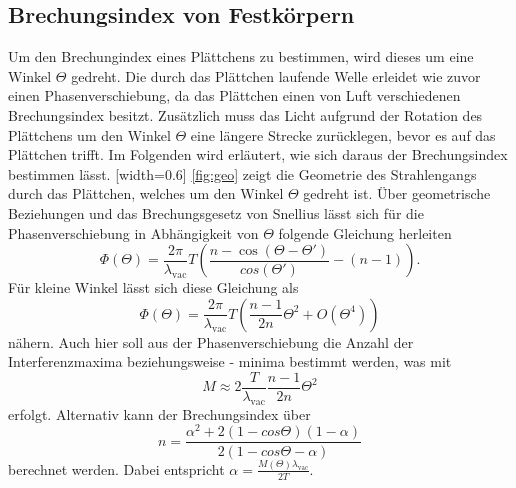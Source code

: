 \subsection{Brechungsindex von Festkörpern}
Um den Brechungindex eines Plättchens zu bestimmen, wird dieses um eine Winkel $\Theta$ gedreht. Die durch das Plättchen laufende Welle erleidet wie zuvor einen Phasenverschiebung, da das Plättchen einen von Luft verschiedenen Brechungsindex besitzt. Zusätzlich muss das Licht aufgrund der Rotation des Plättchens um den Winkel $\Theta$ eine längere Strecke zurücklegen, bevor es auf das Plättchen trifft. Im Folgenden wird erläutert, wie sich daraus der Brechungsindex bestimmen lässt.
[width=0.6\textwidth]
\autoref{fig:geo} zeigt die Geometrie des Strahlengangs durch das Plättchen, welches um den Winkel $\Theta$ gedreht ist. Über geometrische Beziehungen und das Brechungsgesetz von Snellius lässt sich für die Phasenverschiebung in Abhängigkeit von $\Theta$ folgende Gleichung herleiten
\begin{equation}
  \Phi(\Theta) = \frac{2\pi}{\lambda_\mathrm{vac}}T \left( \frac{n-\cos(\Theta-\Theta')}{cos(\Theta')} - (n-1)\right).
\end{equation}
Für kleine Winkel lässt sich diese Gleichung als
\begin{equation}
  \Phi(\Theta) = \frac{2\pi}{\lambda_\mathrm{vac}}T\left(\frac{n-1}{2n}\Theta^2+O(\Theta^4)\right)
\end{equation}
nähern. Auch hier soll aus der Phasenverschiebung die Anzahl der Interferenzmaxima beziehungsweise - minima bestimmt werden, was mit
\begin{equation}
  M \approx 2 \frac{T}{\lambda_\mathrm{vac}}\frac{n-1}{2n}\Theta^2
\end{equation}
erfolgt. Alternativ kann der Brechungsindex über
\begin{equation}
  n = \frac{\alpha^2+2(1-cos\Theta)(1-\alpha)}{2(1-cos\Theta -\alpha)}
\end{equation}
berechnet werden. Dabei entspricht $\alpha = \frac{M(\Theta)\lambda_\mathrm{vac}}{2T}$.
